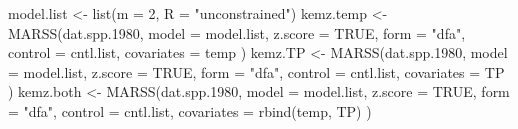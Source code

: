 \begin{Schunk}
\begin{Sinput}
 model.list <- list(m = 2, R = "unconstrained")
 kemz.temp <- MARSS(dat.spp.1980,
   model = model.list, z.score = TRUE,
   form = "dfa", control = cntl.list, covariates = temp
 )
 kemz.TP <- MARSS(dat.spp.1980,
   model = model.list, z.score = TRUE,
   form = "dfa", control = cntl.list, covariates = TP
 )
 kemz.both <- MARSS(dat.spp.1980,
   model = model.list, z.score = TRUE,
   form = "dfa", control = cntl.list, covariates = rbind(temp, TP)
 )
\end{Sinput}
\end{Schunk}
